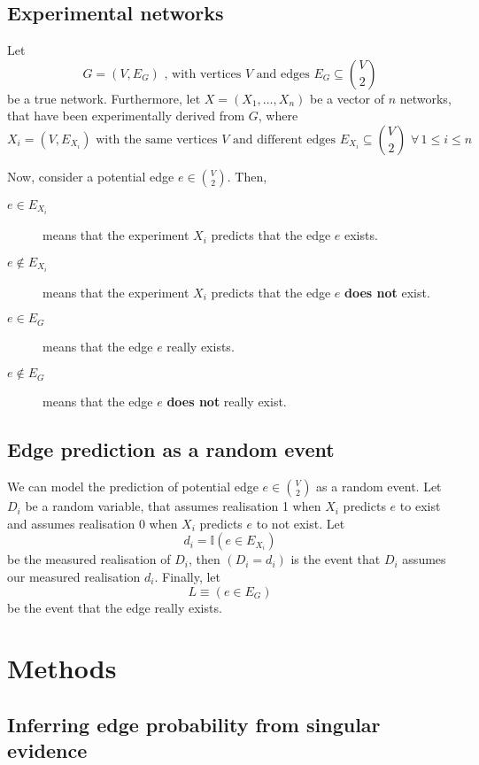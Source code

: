 \documentclass{scrartcl}
\newcommand{\prob}{\mathbb{P}}
\newcommand{\odds}{\mathbb{O}}
\newtheorem{definition}{Definition}
\begin{document}

\subsection{Experimental networks}
Let 
$$G = (V, E_G) \text{ , with vertices } V \text{ and edges } E_G \subseteq \binom{V}{2}$$ 
be a true network. 
Furthermore, let $X = (X_1, \ldots , X_n)$ be a vector of $n$ networks, that have been experimentally derived from $G$, where
$$X_i = (V, E_{X_i}) \text{ with the same vertices } V \text{ and different edges } E_{X_i} \subseteq \binom{V}{2} \,\,\forall\, 1 \le i \le n$$

Now, consider a potential edge $e \in \binom{V}{2}$. Then,
\begin{description}
	\item[$e \in E_{X_i}$] means that the experiment $X_i$ predicts that the edge $e$ exists.
	\item[$e \notin E_{X_i}$] means that the experiment $X_i$ predicts that the edge $e$ \textbf{does not} exist.
	\item[$e \in E_G$] means that the edge $e$ really exists.
	\item[$e \notin E_G$] means that the edge $e$ \textbf{does not} really exist.
\end{description}

\subsection{Edge prediction as a random event}
We can model the prediction of potential edge $e \in \binom{V}{2}$ as a random event. Let $D_i$ be a random variable, that assumes realisation 1 when $X_i$ predicts $e$ to exist and assumes realisation 0 when $X_i$ predicts $e$ to not exist. Let $$d_i = \mathbb{I}(e \in E_{X_i})$$ be the measured realisation of $D_i$, then $(D_i = d_i)$ is the event that $D_i$ assumes our measured realisation $d_i$.
Finally, let $$L \equiv (e \in E_G)$$ be the event that the edge really exists.


\section{Methods}

\subsection{Inferring edge probability from singular evidence}
\end{document}
